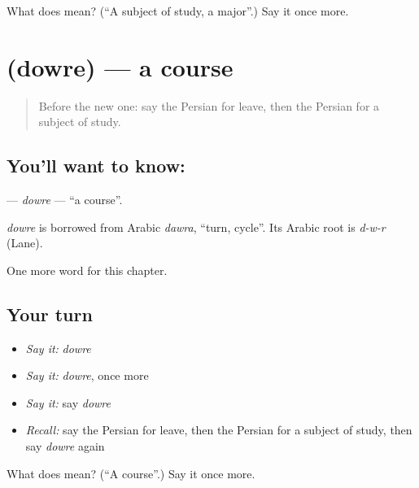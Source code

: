 \begin{tcolorbox}[breakable,colback=teal!4,colframe=teal!35!black,title={Before you move on}]
What does  mean? (\textquotedblleft{}A subject of study, a major\textquotedblright{}.) Say it once more.
\end{tcolorbox}
\section[\texorpdfstring{\fa{دوره} (dowre)}{دوره (dowre)}]{ (dowre) — a course}

\label{lesson:FA-C177-dowre}



\begin{quote}
Before the new one: say the Persian for leave, then the Persian for a subject of study.
\end{quote}

\subsection*{You'll want to know: }
\textbf{} — \emph{dowre} — \textquotedblleft{}a course\textquotedblright{}.

\begin{cousinweb}
\emph{dowre} is borrowed from Arabic \emph{dawra}, \textquotedblleft{}turn, cycle\textquotedblright{}. Its Arabic root is \emph{d-w-r} (Lane).
\end{cousinweb}

\begin{grammarlens}[title={What you've built}]
One more word for this chapter.
\end{grammarlens}

\subsection*{Your turn}
\begin{itemize}
\raggedright
  \item \emph{Say it:} \emph{dowre}
  \item \emph{Say it:} \emph{dowre}, once more
  \item \emph{Say it:} say \emph{dowre}
  \item \emph{Recall:} say the Persian for leave, then the Persian for a subject of study, then say \emph{dowre} again
\end{itemize}

\begin{tcolorbox}[breakable,colback=teal!4,colframe=teal!35!black,title={Before you move on}]
What does  mean? (\textquotedblleft{}A course\textquotedblright{}.) Say it once more.
\end{tcolorbox}
